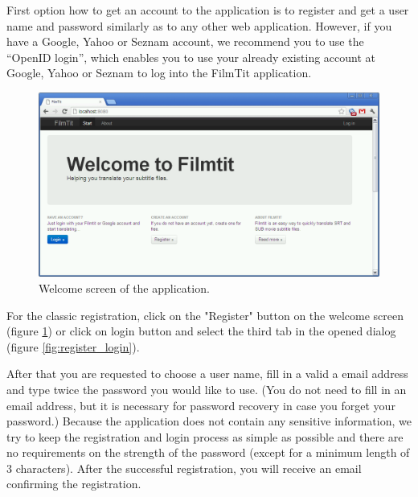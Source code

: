 First option how to get an account to the application is to register and get a user name and password similarly as to any other web application. However, if you have a Google, Yahoo or Seznam account, we recommend you to use the ``OpenID login'', which enables you to use your already existing account at Google, Yahoo or Seznam to log into the FilmTit application.

\begin{figure}[h]
\begin{center}
\includegraphics[scale=0.4]{figures/user_manual/welcome_screen.png}
\end{center}
\caption{Welcome screen of the application.}
\label{fig:welcome}
\end{figure}

For the classic registration, click on the "Register" button on the welcome screen (figure \ref{fig:welcome}) or click on login button and select the third tab in the opened dialog (figure \ref{fig:register_login}).

After that you are requested to choose a user name, fill in a valid a email address and type twice the password you would like to use. (You do not need to fill in an email address, but it is necessary for password recovery in case you forget your password.) Because the application does not contain any sensitive information, we try to keep the registration and login process as simple as possible and there are no requirements on the strength of the password (except for a minimum length of 3 characters). After the successful registration, you will receive an email confirming the registration.

